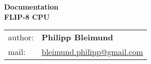 \author{}

\begin{titlepage}
    \begin{center}
        \LARGE{\textbf{Documentation}}\\[3ex]
        \huge{\textbf{FLIP-8 CPU}}\\[40ex]
        \normalsize{}
        \begin{tabular}{ll}
            author:            & \quad \textbf{Philipp Bleimund}     \\[2ex]
            mail:            & \quad \href{mailto:bleimund.philipp@gmail.com}{bleimund.philipp@gmail.com} \\[1ex]
        \end{tabular}
    \end{center}
\end{titlepage}
